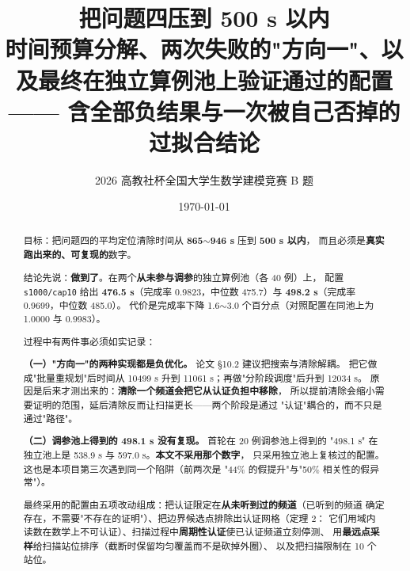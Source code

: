 

\title{\heiti 把问题四压到 500 s 以内\\[4pt]
       \large 时间预算分解、两次失败的"方向一"、以及最终在独立算例池上验证通过的配置\\[2pt]
       \normalsize —— 含全部负结果与一次被自己否掉的过拟合结论}
\author{2026 高教社杯全国大学生数学建模竞赛 B 题}
\date{\today}


\maketitle
\thispagestyle{fancy}

\begin{abstract}
\noindent
目标：把问题四的平均定位清除时间从 \textbf{865$\sim$946 s} 压到 \textbf{500 s 以内}，
而且必须是\textbf{真实跑出来的、可复现的}数字。

结论先说：\textbf{做到了}。在两个\textbf{从未参与调参}的独立算例池（各 40 例）上，
配置 \texttt{s1000/cap10} 给出
\textbf{476.5 s}（完成率 0.9823，中位数 475.7）与 \textbf{498.2 s}（完成率 0.9699，中位数 485.0）。
代价是完成率下降 1.6$\sim$3.0 个百分点（对照配置在同池上为 1.0000 与 0.9983）。

过程中有两件事必须如实记录：

\textbf{（一）"方向一"的两种实现都是负优化。} 论文 §10.2 建议把搜索与清除解耦。
把它做成"批量重规划"后时间从 10499 s 升到 11061 s；再做"分阶段调度"后升到 12034 s。
原因是后来才测出来的：\textbf{清除一个频道会把它从认证负担中移除}，
所以提前清除会缩小需要证明的范围，延后清除反而让扫描更长——两个阶段是通过
"认证"耦合的，而不只是通过"路径"。

\textbf{（二）调参池上得到的 498.1 s 没有复现。} 首轮在 20 例调参池上得到的
"498.1 s" 在独立池上是 538.9 s 与 597.0 s。\textbf{本文不采用那个数字}，
只采用独立池上复核过的配置。这也是本项目第三次遇到同一个陷阱（前两次是
"44\% 的假提升"与"50\% 相关性的假异常"）。

最终采用的配置由五项改动组成：把认证限定在\textbf{从未听到过的频道}（已听到的频道
确定存在，不需要"不存在的证明"）、把边界候选点排除出认证网格（定理 2：
它们用域内读数在数学上不可认证）、扫描过程中\textbf{周期性认证}使已认证频道立刻停测、
用\textbf{最远点采样}给扫描站位排序（截断时保留均匀覆盖而不是砍掉外圈）、
以及把扫描限制在 10 个站位。
\end{abstract}

\tableofcontents
\newpage

